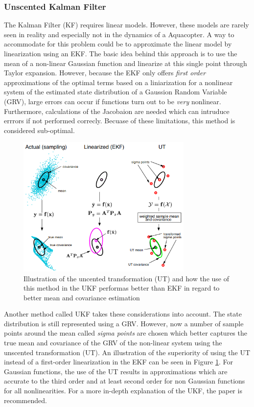 \documentclass[../Head/report.tex]{subfiles}
\begin{document}
\subsubsection{Unscented Kalman Filter}
\label{sec:ukf}

The Kalman Filter (KF) requires linear models. However, these models are rarely seen in reality and especially not in the dynamics of a Aquacopter. A way to accommodate for this problem could be to approximate the linear model by linearization using an EKF. The basic idea behind this approach is to use the mean of a non-linear Gaussian function and linearize at this single point through Taylor expansion. However, because the EKF only offers \textit{first order} approximations of the optimal terms based on a liniarization for a nonlinear system of the estimated state distribution of a Gaussion Random Variable (GRV), large errors can occur if functions turn out to be \textit{very} nonlinear. Furthermore, calculations of the Jacobaion are needed which can intruduce errrors if not performed correcly. Becuase of these limitations, this method is considered sub-optimal.  

\begin{figure}[H]
	\centering
	\includegraphics[height=7.0cm]{../Figures/ukf.png}
	\caption{Illustration of the uncented transformation (UT) and how the use of this method in the UKF performas better than EKF in regard to better mean and covariance estimation \cite{UnscentedKalmanFilter}} \label{fig:ut}
\end{figure}

Another method called UKF takes these considerations into account. The state distribution is still represented using a GRV. However, now a number of sample points around the mean called \textit{sigma points} are chosen which better captures the true mean and covariance of the GRV of the non-linear system using the unscented transformation (UT). An illustration of the superiority of using the UT instead of a first-order linearization in the EKF can be seen in Figure \ref{fig:ut}. For Gaussian functions, the use of the UT results in approximations which are accurate to the third order and at least second order for non Gaussian functions for all nonlinearities. For a more in-depth explanation of the UKF, the paper \cite{UnscentedKalmanFilter} is recommended.  
\end{document}
